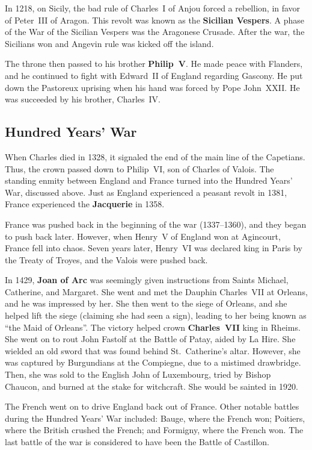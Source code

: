 In 1218, on Sicily, the bad rule of Charles~I of Anjou forced a rebellion, in favor of Peter~III of Aragon.
This revolt was known as the \textbf{Sicilian Vespers}.
A phase of the War of the Sicilian Vespers was the Aragonese Crusade.
After the war, the Sicilians won and Angevin rule was kicked off the island.

The throne then passed to his brother \textbf{Philip~V}.
He made peace with Flanders, and he continued to fight with Edward~II of England regarding Gascony.
He put down the Pastoreux uprising when his hand was forced by Pope John~XXII\@.
He was succeeded by his brother, Charles~IV\@.

\subsection*{Hundred Years' War}

When Charles died in 1328, it signaled the end of the main line of the Capetians.
Thus, the crown passed down to Philip~VI, son of Charles of Valois.
The standing enmity between England and France turned into the Hundred Years' War, discussed above.
Just as England experienced a peasant revolt in 1381, France experienced the \textbf{Jacquerie} in 1358.

France was pushed back in the beginning of the war (1337--1360), and they began to push back later.
However, when Henry~V of England won at Agincourt, France fell into chaos.
Seven years later, Henry~VI was declared king in Paris by the Treaty of Troyes, and the Valois were pushed back.

In 1429, \textbf{Joan of Arc} was seemingly given instructions from Saints Michael, Catherine, and Margaret.
She went and met the Dauphin Charles~VII at Orleans, and he was impressed by her.
She then went to the siege of Orleans, and she helped lift the siege (claiming she had seen a sign),
leading to her being known as ``the Maid of Orleans''.
The victory helped crown \textbf{Charles~VII} king in Rheims.
She went on to rout John Fastolf at the Battle of Patay, aided by La Hire.
She wielded an old sword that was found behind St.\ Catherine's altar.
However, she was captured by Burgundians at the Compiegne, due to a mistimed drawbridge.
Then, she was sold to the English John of Luxembourg, tried by Bishop Chaucon, and burned at the stake for witchcraft.
She would be sainted in 1920.

The French went on to drive England back out of France.
Other notable battles during the Hundred Years' War included:
Bauge, where the French won;
Poitiers, where the British crushed the French;
and Formigny, where the French won.
The last battle of the war is considered to have been the Battle of Castillon.

